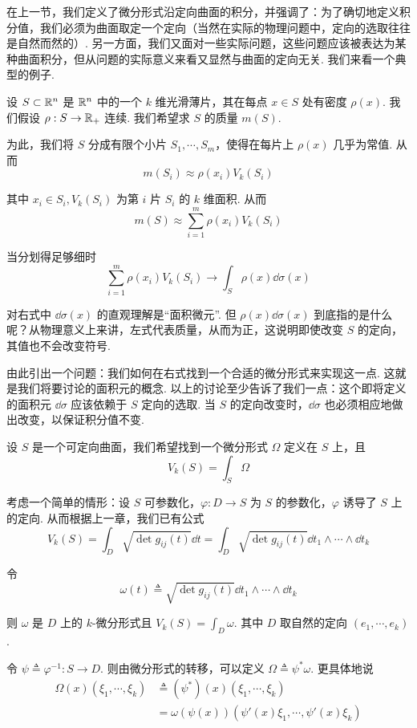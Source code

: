 
在上一节，我们定义了微分形式沿定向曲面的积分，并强调了：为了确切地定义积分值，我们必须为曲面取定一个定向（当然在实际的物理问题中，定向的选取往往是自然而然的）. 另一方面，我们又面对一些实际问题，这些问题应该被表达为某种曲面积分，但从问题的实际意义来看又显然与曲面的定向无关. 我们来看一个典型的例子.

设 $S\subset\mathbb{R}^n$ 是 $\mathbb{R}^n$ 中的一个 $k$ 维光滑薄片，其在每点 $x\in S$ 处有密度 $\rho(x)$. 我们假设 $\rho:S\to\mathbb{R}_+$ 连续. 我们希望求 $S$ 的质量 $m(S)$.

为此，我们将 $S$ 分成有限个小片 $S_1,\cdots,S_m$，使得在每片上 $\rho(x)$ 几乎为常值. 从而
$$
m(S_i)\approx\rho(x_i)V_k(S_i)
$$

其中 $x_i\in S_i,V_k(S_i)$ 为第 $i$ 片 $S_i$ 的 $k$ 维面积. 从而
$$
m(S)\approx\sum_{i=1}^m\rho(x_i)V_k(S_i)
$$

当分划得足够细时
$$
\sum_{i=1}^m\rho(x_i)V_k(S_i)\longrightarrow\int_S\rho(x)\dd\sigma(x)
$$

对右式中 $\dd\sigma(x)$ 的直观理解是“面积微元”. 但 $\rho(x)\dd\sigma(x)$ 到底指的是什么呢？从物理意义上来讲，左式代表质量，从而为正，这说明即使改变 $S$ 的定向，其值也不会改变符号.

由此引出一个问题：我们如何在右式找到一个合适的微分形式来实现这一点. 这就是我们将要讨论的面积元的概念. 以上的讨论至少告诉了我们一点：这个即将定义的面积元 $\dd\sigma$ 应该依赖于 $S$ 定向的选取. 当 $S$ 的定向改变时，$\dd\sigma$ 也必须相应地做出改变，以保证积分值不变.


设 $S$ 是一个可定向曲面，我们希望找到一个微分形式 $\Omega$ 定义在 $S$ 上，且
$$
V_k(S)=\int_S\Omega
$$

考虑一个简单的情形：设 $S$ 可参数化，$\varphi:D\to S$ 为 $S$ 的参数化，$\varphi$ 诱导了 $S$ 上的定向. 从而根据上一章，我们已有公式
$$
V_k(S)=\int_D\sqrt{\det g_{ij}(t)}\dd t=\int_D\sqrt{\det g_{ij}(t)}\dd t_1\wedge\cdots\wedge\dd t_k
$$

令
$$
\omega(t)\triangleq\sqrt{\det g_{ij}(t)}\dd t_1\wedge\cdots\wedge\dd t_k
$$

则 $\omega$ 是 $D$ 上的 $k$-微分形式且 $\displaystyle V_k(S)=\int_D\omega$. 其中 $D$ 取自然的定向 $(e_1,\cdots,e_k)$.

令 $\psi\triangleq\varphi^{-1}:S\to D$. 则由微分形式的转移，可以定义 $\Omega\triangleq\psi^*\omega$. 更具体地说
$$
\begin{aligned}
    \Omega(x)(\xi_1,\cdots,\xi_k)&\triangleq(\psi^*)(x)(\xi_1,\cdots,\xi_k)\\
    &=\omega(\psi(x))(\psi'(x)\xi_1,\cdots,\psi'(x)\xi_k)
\end{aligned}
$$

